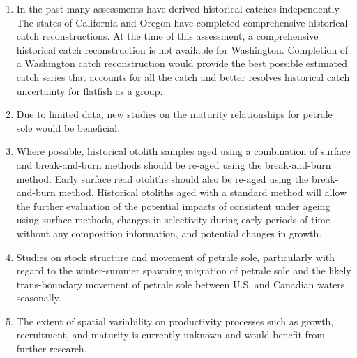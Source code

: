 \documentclass[12pt,]{article}
\begin{document}
\begin{enumerate}

\item In the past many assessments have derived historical catches independently. The states of California and Oregon have completed comprehensive historical catch reconstructions. At the time of this assessment, a comprehensive historical catch reconstruction is not available for Washington. Completion of a Washington catch reconstruction would provide the best possible estimated catch series that accounts for all the catch and better resolves historical catch uncertainty for flatfish as a group.

\item Due to limited data, new studies on the maturity relationships for petrale sole would be beneficial.

\item Where possible, historical otolith samples aged using a combination of surface and break-and-burn methods should be re-aged using the break-and-burn method. Early surface read otoliths should also be re-aged using the break-and-burn method. Historical otoliths aged with a standard method will allow the further evaluation of the potential impacts of consistent under ageing using surface methods, changes in selectivity during early periods of time without any composition information, and potential changes in growth.

\item Studies on stock structure and movement of petrale sole, particularly with regard to the winter-summer spawning migration of petrale sole and the likely trans-boundary movement of petrale sole between U.S. and Canadian waters seasonally.

\item The extent of spatial variability on productivity processes such as growth, recruitment, and maturity is currently unknown and would benefit from further research.

\end{enumerate}
\end{document}

